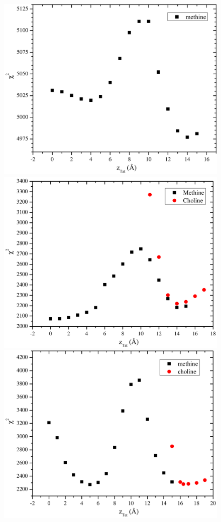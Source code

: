 \begin{figure}[htbp]
  \centering
  \includegraphics[scale=0.3]{figures/Tat/SDP_Results/X2/DOPCDOPE3to1_Tat_62to1_3p0_X2}
  \includegraphics[scale=0.3]{figures/Tat/SDP_Results/X2/DOPCDOPE3to1_Tat_28to1_3p0_X2}
  \includegraphics[scale=0.3]{figures/Tat/SDP_Results/X2/DOPCDOPE3to1_Tat_16to1_3p0_X2}

\end{figure}

